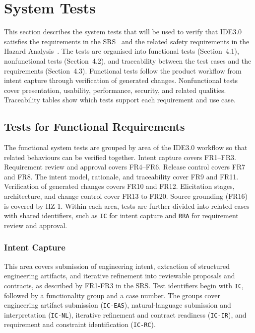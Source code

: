 \documentclass[12pt, titlepage]{article}
\begin{document}
\section{System Tests}

This section describes the system tests that will be used to verify that
IDE3.0 satisfies the requirements in the SRS~\citep{SRS} and the related
safety requirements in the Hazard Analysis~\citep{HazardAnalysis}. The tests
are organised into functional tests (Section~4.1), nonfunctional tests
(Section~4.2), and traceability between the test cases and the requirements
(Section~4.3). Functional tests follow the product workflow from intent
capture through verification of generated changes. Nonfunctional tests cover
presentation, usability, performance, security, and related qualities.
Traceability tables show which tests support each requirement and use case.

\subsection{Tests for Functional Requirements}

The functional system tests are grouped by area of the IDE3.0 workflow so
that related behaviours can be verified together. Intent capture covers
FR1--FR3. Requirement review and approval covers FR4--FR6. Release control
covers FR7 and FR8. The intent model, rationale, and traceability
cover FR9 and FR11. Verification of generated changes covers FR10 and
FR12. Elicitation stages, architecture, and change control cover FR13 to FR20.
Source grounding (FR16) is covered by HZ-1. Within each area, tests are further divided into related cases with
shared identifiers, such as \texttt{IC} for intent capture and \texttt{RRA}
for requirement review and approval.

\subsubsection{Intent Capture}

This area covers submission of engineering intent, extraction of structured
engineering artifacts, and iterative refinement into reviewable proposals
and contracts, as described by FR1-FR3 in the SRS. Test
identifiers begin with \texttt{IC}, followed by a functionality group and
a case number. The groups cover engineering artifact submission
(\texttt{IC-EAS}), natural-language submission and interpretation
(\texttt{IC-NL}), iterative refinement and contract readiness
(\texttt{IC-IR}), and requirement and constraint identification
(\texttt{IC-RC}).
\end{document}
